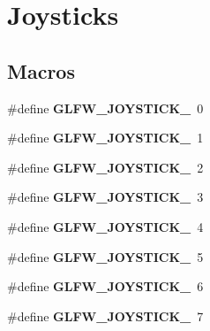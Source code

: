 \hypertarget{group__joysticks}{}\section{Joysticks}
\label{group__joysticks}
\subsection*{Macros}
\begin{DoxyCompactItemize}
\item 
\hypertarget{group__joysticks_ga34a0443d059e9f22272cd4669073f73d}{}\#define {\bfseries G\+L\+F\+W\+\_\+\+J\+O\+Y\+S\+T\+I\+C\+K\+\_}~0\label{group__joysticks_ga34a0443d059e9f22272cd4669073f73d}

\item 
\hypertarget{group__joysticks_ga6eab65ec88e65e0850ef8413504cb50c}{}\#define {\bfseries G\+L\+F\+W\+\_\+\+J\+O\+Y\+S\+T\+I\+C\+K\+\_}~1\label{group__joysticks_ga6eab65ec88e65e0850ef8413504cb50c}

\item 
\hypertarget{group__joysticks_gae6f3eedfeb42424c2f5e3161efb0b654}{}\#define {\bfseries G\+L\+F\+W\+\_\+\+J\+O\+Y\+S\+T\+I\+C\+K\+\_}~2\label{group__joysticks_gae6f3eedfeb42424c2f5e3161efb0b654}

\item 
\hypertarget{group__joysticks_ga97ddbcad02b7f48d74fad4ddb08fff59}{}\#define {\bfseries G\+L\+F\+W\+\_\+\+J\+O\+Y\+S\+T\+I\+C\+K\+\_}~3\label{group__joysticks_ga97ddbcad02b7f48d74fad4ddb08fff59}

\item 
\hypertarget{group__joysticks_gae43281bc66d3fa5089fb50c3e7a28695}{}\#define {\bfseries G\+L\+F\+W\+\_\+\+J\+O\+Y\+S\+T\+I\+C\+K\+\_}~4\label{group__joysticks_gae43281bc66d3fa5089fb50c3e7a28695}

\item 
\hypertarget{group__joysticks_ga74771620aa53bd68a487186dea66fd77}{}\#define {\bfseries G\+L\+F\+W\+\_\+\+J\+O\+Y\+S\+T\+I\+C\+K\+\_}~5\label{group__joysticks_ga74771620aa53bd68a487186dea66fd77}

\item 
\hypertarget{group__joysticks_ga20a9f4f3aaefed9ea5e66072fc588b87}{}\#define {\bfseries G\+L\+F\+W\+\_\+\+J\+O\+Y\+S\+T\+I\+C\+K\+\_}~6\label{group__joysticks_ga20a9f4f3aaefed9ea5e66072fc588b87}

\item 
\hypertarget{group__joysticks_ga21a934c940bcf25db0e4c8fe9b364bdb}{}\#define {\bfseries G\+L\+F\+W\+\_\+\+J\+O\+Y\+S\+T\+I\+C\+K\+\_}~7\label{group__joysticks_ga21a934c940bcf25db0e4c8fe9b364bdb}


\end{DoxyCompactItemize}
